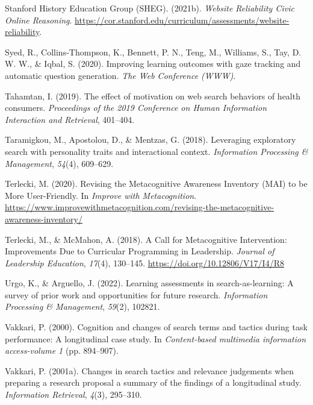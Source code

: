 \documentclass[letterpaper, nobind]{templates/ociamthesis}
\newlength{\cslhangindent}
\newenvironment{CSLReferences}[2] %
 {%
  \setlength{\parindent}{0pt}
  \ifodd #1
  \let\oldpar\par
  \def\par{\hangindent=\cslhangindent\oldpar}
  \fi
  \setlength{\parskip}{1mm}
  \setlength{\baselineskip}{6mm}
 }%
 {}
\begin{document}
\begin{CSLReferences}{1}{0}
\leavevmode{}%
Stanford History Education Group (SHEG). (2021b). \emph{Website {Reliability} \textbar{} {Civic Online Reasoning}}. \url{https://cor.stanford.edu/curriculum/assessments/website-reliability}.

\leavevmode{}%
Syed, R., Collins-Thompson, K., Bennett, P. N., Teng, M., Williams, S., Tay, D. W. W., \& Iqbal, S. (2020). Improving learning outcomes with gaze tracking and automatic question generation. \emph{The Web Conference (WWW)}.

\leavevmode{}%
Tahamtan, I. (2019). The effect of motivation on web search behaviors of health consumers. \emph{Proceedings of the 2019 Conference on Human Information Interaction and Retrieval}, 401--404.

\leavevmode{}%
Taramigkou, M., Apostolou, D., \& Mentzas, G. (2018). Leveraging exploratory search with personality traits and interactional context. \emph{Information Processing \& Management}, \emph{54}(4), 609--629.

\leavevmode{}%
Terlecki, M. (2020). Revising the {Metacognitive Awareness Inventory} ({MAI}) to be {More User}-{Friendly}. In \emph{Improve with Metacognition}. \url{https://www.improvewithmetacognition.com/revising-the-metacognitive-awareness-inventory/}

\leavevmode{}%
Terlecki, M., \& McMahon, A. (2018). A {Call} for {Metacognitive Intervention}: Improvements {Due} to {Curricular Programming} in {Leadership}. \emph{Journal of Leadership Education}, \emph{17}(4), 130--145. \url{https://doi.org/10.12806/V17/I4/R8}

\leavevmode{}%
Urgo, K., \& Arguello, J. (2022). Learning assessments in search-as-learning: A survey of prior work and opportunities for future research. \emph{Information Processing \& Management}, \emph{59}(2), 102821.

\leavevmode{}%
Vakkari, P. (2000). Cognition and changes of search terms and tactics during task performance: A longitudinal case study. In \emph{Content-based multimedia information access-volume 1} (pp. 894--907).

\leavevmode{}%
Vakkari, P. (2001a). Changes in search tactics and relevance judgements when preparing a research proposal a summary of the findings of a longitudinal study. \emph{Information Retrieval}, \emph{4}(3), 295--310.


\end{CSLReferences}
\end{document}
